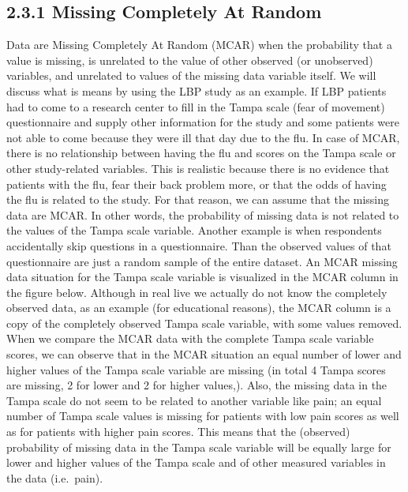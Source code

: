 \documentclass[]{book}
\theoremstyle{definition}
\theoremstyle{definition}
\theoremstyle{definition}
\theoremstyle{remark}
\begin{document}
\subsection{2.3.1 Missing Completely At
Random}\label{missing-completely-at-random}

Data are Missing Completely At Random (MCAR) when the probability that a
value is missing, is unrelated to the value of other observed (or
unobserved) variables, and unrelated to values of the missing data
variable itself. We will discuss what is means by using the LBP study as
an example. If LBP patients had to come to a research center to fill in
the Tampa scale (fear of movement) questionnaire and supply other
information for the study and some patients were not able to come
because they were ill that day due to the flu. In case of MCAR, there is
no relationship between having the flu and scores on the Tampa scale or
other study-related variables. This is realistic because there is no
evidence that patients with the flu, fear their back problem more, or
that the odds of having the flu is related to the study. For that
reason, we can assume that the missing data are MCAR. In other words,
the probability of missing data is not related to the values of the
Tampa scale variable. Another example is when respondents accidentally
skip questions in a questionnaire. Than the observed values of that
questionnaire are just a random sample of the entire dataset. An MCAR
missing data situation for the Tampa scale variable is visualized in the
MCAR column in the figure below. Although in real live we actually do
not know the completely observed data, as an example (for educational
reasons), the MCAR column is a copy of the completely observed Tampa
scale variable, with some values removed. When we compare the MCAR data
with the complete Tampa scale variable scores, we can observe that in
the MCAR situation an equal number of lower and higher values of the
Tampa scale variable are missing (in total 4 Tampa scores are missing, 2
for lower and 2 for higher values,). Also, the missing data in the Tampa
scale do not seem to be related to another variable like pain; an equal
number of Tampa scale values is missing for patients with low pain
scores as well as for patients with higher pain scores. This means that
the (observed) probability of missing data in the Tampa scale variable
will be equally large for lower and higher values of the Tampa scale and
of other measured variables in the data (i.e.~pain).
\end{document}
